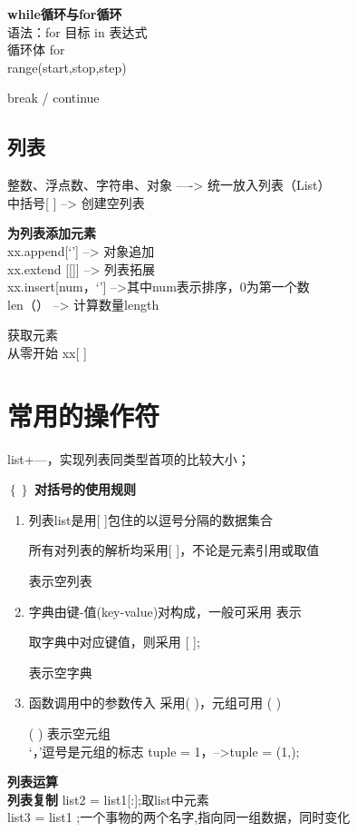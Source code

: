 \documentclass[a4paper,10pt]{ctexart}
\begin{document}
\textbf{while循环与for循环}\\
语法：for 目标 in 表达式
\\ 循环体 for
\\ range(start,stop,step)

break / continue

\subsection{列表}

整数、浮点数、字符串、对象    ----> 统一放入列表（List）\\
中括号[ ] --> 创建空列表%

\textbf{为列表添加元素}\\
xx.append[‘’] --> 对象追加\\
xx.extend [[]] --> 列表拓展\\
xx.insert[num，‘’] -->其中num表示排序，0为第一个数\\
len（） --> 计算数量length

获取元素\\
从零开始  xx[ ]

\section{常用的操作符}
list+—，实现列表同类型首项的比较大小；\par
$\left\{   \right\}$
\textbf{对括号的使用规则}
\begin{enumerate}
  \item 列表list是用[ ]包住的以逗号分隔的数据集合

        所有对列表的解析均采用[ ]，不论是元素引用或取值\par
        [ ]表示空列表

  \item 字典由键-值(key-value)对构成，一般可采用{ }表示

        取字典中对应键值，则采用 [ ];\par
        { }表示空字典

  \item 函数调用中的参数传入 采用( )，元组可用 ( )\par
        ( ) 表示空元组\\
        ‘，’逗号是元组的标志
        tuple = 1，-->tuple = (1,);


\end{enumerate}

\textbf{列表运算}%
~\\
\textbf{列表复制}
list2 = list1[:];取list中元素\\
list3 = list1 ;一个事物的两个名字,指向同一组数据，同时变化\\ \vbox{}
\end{document}

